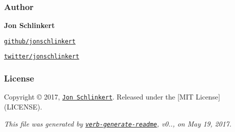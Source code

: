 

\subsubsection*{Author}

{\bfseries Jon Schlinkert}


\begin{DoxyItemize}
\item \href{https://github.com/jonschlinkert}{\tt github/jonschlinkert}
\item \href{https://twitter.com/jonschlinkert}{\tt twitter/jonschlinkert}
\end{DoxyItemize}

\subsubsection*{License}

Copyright © 2017, \href{https://github.com/jonschlinkert}{\tt Jon Schlinkert}. Released under the \mbox{[}M\+IT License\mbox{]}(L\+I\+C\+E\+N\+SE).





{\itshape This file was generated by \href{https://github.com/verbose/verb-generate-readme}{\tt verb-\/generate-\/readme}, v0.., on May 19, 2017.} 